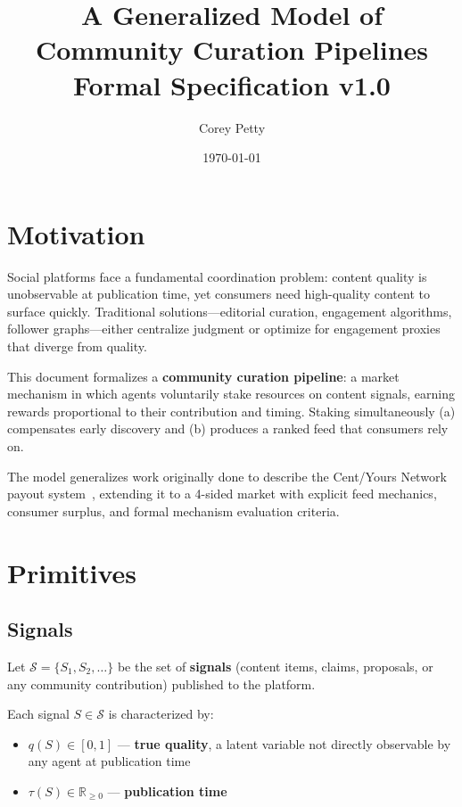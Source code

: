 \documentclass[12pt]{article}
\title{\textbf{A Generalized Model of Community Curation Pipelines}\\[0.4em]
\large Formal Specification v1.0}
\author{Corey Petty}
\date{\today}
\begin{document}
\maketitle
\tableofcontents
\newpage

\section{Motivation}

Social platforms face a fundamental coordination problem: content quality is unobservable at publication time, yet consumers need high-quality content to surface quickly. Traditional solutions---editorial curation, engagement algorithms, follower graphs---either centralize judgment or optimize for engagement proxies that diverge from quality.

This document formalizes a \textbf{community curation pipeline}: a market mechanism in which agents voluntarily stake resources on content signals, earning rewards proportional to their contribution and timing. Staking simultaneously (a) compensates early discovery and (b) produces a ranked feed that consumers rely on.

The model generalizes work originally done to describe the Cent/Yours Network payout system~\cite{corpetty2016}, extending it to a 4-sided market with explicit feed mechanics, consumer surplus, and formal mechanism evaluation criteria.

\section{Primitives}

\subsection{Signals}

Let $\mathcal{S} = \{S_1, S_2, \ldots\}$ be the set of \textbf{signals} (content items, claims, proposals, or any community contribution) published to the platform.

Each signal $S \in \mathcal{S}$ is characterized by:
\begin{itemize}
  \item $q(S) \in [0, 1]$ --- \textbf{true quality}, a latent variable not directly observable by any agent at publication time
  \item $\tau(S) \in \mathbb{R}_{\geq 0}$ --- \textbf{publication time}
\end{itemize}
\end{document}
